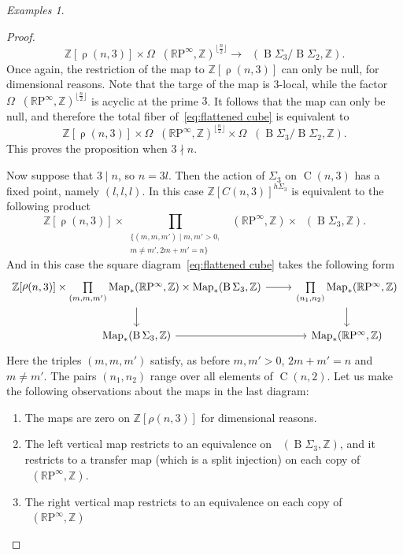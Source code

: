 \documentclass[psamsfonts]{amsart}
\theoremstyle{plain}
\theoremstyle{definition}
\theoremstyle{remark}
\newtheorem{exmps}[thm]{Examples}
\newcommand{\Z}{\mathbb{Z}}
\newcommand{\RP}{\mathbb{R}\mathrm{P}}
\newcommand{\classifying}{\operatorname{B}}
\DeclareMathOperator{\map}{Map}
\DeclareMathOperator{\pointedmaps}{\map_*}
\DeclareMathOperator{\Part}{\rho}
\DeclareMathOperator{\Comp}{C}
\begin{document}
\begin{exmps}
\begin{proof}
\[
\Z[\Part(n, 3)]\times \Omega \pointedmaps(\RP^\infty, \Z)^{\lfloor\frac{n}{2}\rfloor}\to \pointedmaps(\classifying\Sigma_3/\classifying\Sigma_2, \Z).
\]
Once again, the restriction of the map to $\Z[\Part(n, 3)]$ can only be null, for dimensional reasons. Note that the targe of the map is $3$-local, while the factor $\Omega \pointedmaps(\RP^\infty, \Z)^{\lfloor\frac{n}{2}\rfloor}$ is acyclic at the prime $3$. It follows that the map can only be null, and therefore the total fiber of~\eqref{eq:flattened cube} is equivalent to
\[
\Z[\Part(n, 3)]\times \Omega \pointedmaps(\RP^\infty, \Z)^{\lfloor\frac{n}{2}\rfloor}\times  \Omega\pointedmaps(\classifying\Sigma_3/\classifying\Sigma_2, \Z).
\]
This proves the proposition when $3\nmid n$. 

Now suppose that $3\mid n$, so $n=3l$. Then the action of $\Sigma_3$ on $\Comp(n, 3)$ has a fixed point, namely $(l,l,l)$. In this case $\Z[C(n, 3)]^{h\Sigma_3}$ is equivalent to the following product
\[
 \Z[\Part(n, 3)]\times \prod_{\begin{array}{c}{\{(m, m, m')\mid m, m'>0,} \\ {  m\ne m', 2m+m'=n\}}\end{array}}\pointedmaps (\RP^\infty,\Z)\times \pointedmaps(\classifying\Sigma_3, \Z).
\]
And in this case the square diagram~\eqref{eq:flattened cube}
takes the following form
\[
\begin{tikzcd}
\Z[\Part(n, 3)]\times \underset{(m,m,m')}{\prod}\pointedmaps (\RP^\infty,\Z)\times \pointedmaps(\classifying\Sigma_3, \Z) & {\underset{(n_1, n_2)}{\prod}\pointedmaps(\RP^\infty, \Z)}  \\
	{\pointedmaps({\classifying \Sigma_3}, \Z)} & {\pointedmaps(\RP^\infty, \Z)}
	\arrow[from=1-1, to=1-2]
	\arrow[from=1-1, to=2-1]
	\arrow[from=1-2, to=2-2]
	\arrow[from=2-1, to=2-2]
\end{tikzcd}
\]
Here the triples $(m,m,m')$ satisfy, as before $m, m'>0$, $2m+m'=n$ and $m\ne m'$. The pairs $(n_1, n_2)$ range over all elements of $\Comp(n,2)$. Let us make the following observations about the maps in the last diagram: 
\begin{enumerate}
    \item The maps are zero on $\Z[\rho(n, 3)]$ for dimensional reasons. 
    \item The left vertical map restricts to an equivalence on $\pointedmaps(\classifying\Sigma_3, \Z)$, and it restricts to a transfer map (which is a split injection) on each copy of $\pointedmaps(\RP^\infty, \Z)$. 
    \item The right vertical map restricts to an equivalence on each copy of $\pointedmaps(\RP^\infty, \Z)$ 

\end{enumerate}
\end{proof}
\end{exmps}
\end{document}
